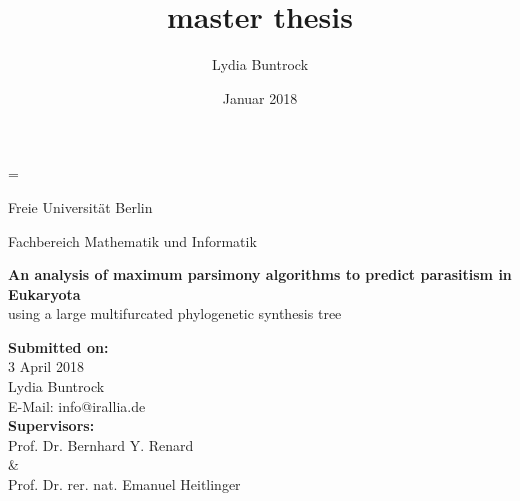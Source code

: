 

\author{Lydia Buntrock}
\title{master thesis}
\date{Januar 2018}

\hfuzz=\maxdimen {} 



  \begin{titlepage}
    \pagestyle{empty}
  	\begin{center}
      {\Large Freie Universität Berlin} \\
    	\begin{Huge}
      	Fachbereich Mathematik und Informatik \\
      	\vspace{3mm}
    	\end{Huge}
    	\vspace{2cm}
    	\begin{Large}
        \textbf{An analysis of maximum parsimony algorithms to predict parasitism in Eukaryota} \\
        \vspace{3mm}
        using a large multifurcated phylogenetic synthesis tree \\
    	\end{Large}
      \vspace{3cm}
      \textbf{Submitted on:} \\
      3 April 2018 \\
    	\vspace{2cm}
    	Lydia Buntrock \\
      E-Mail: info@irallia.de \\
     	\vspace{3cm}
      \textbf{Supervisors:} \\
      Prof. Dr. Bernhard Y. Renard \\
      \& \\
      Prof. Dr. rer. nat. Emanuel Heitlinger \\      
  	\end{center}
    \clearpage
  \end{titlepage}

